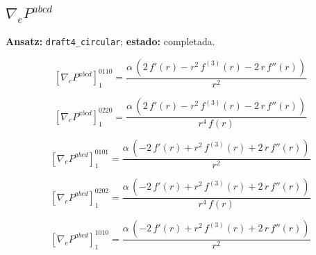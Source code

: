 \documentclass[11pt]{article}
\begin{document}
\subsection*{$ \nabla_e P^{abcd} $}
\textbf{Ansatz:} \texttt{draft4\_circular}; \textbf{estado:} completada.\par
\begin{dmath*}[breakdepth={5}]
\left[\nabla_e P^{abcd}\right]_{1}^{0110} = \frac{\alpha\,\left(2\,f'\!\left(r\right) - {r}^{2}\,f^{(3)}\!\left(r\right) - 2\,r\,f''\!\left(r\right)\right)}{{r}^{2}}
\end{dmath*}
\par\smallskip
\begin{dmath*}[breakdepth={5}]
\left[\nabla_e P^{abcd}\right]_{1}^{0220} = \frac{\alpha\,\left(2\,f'\!\left(r\right) - {r}^{2}\,f^{(3)}\!\left(r\right) - 2\,r\,f''\!\left(r\right)\right)}{{r}^{4}\,f\!\left(r\right)}
\end{dmath*}
\par\smallskip
\begin{dmath*}[breakdepth={5}]
\left[\nabla_e P^{abcd}\right]_{1}^{0101} = \frac{\alpha\,\left(-2\,f'\!\left(r\right) + {r}^{2}\,f^{(3)}\!\left(r\right) + 2\,r\,f''\!\left(r\right)\right)}{{r}^{2}}
\end{dmath*}
\par\smallskip
\begin{dmath*}[breakdepth={5}]
\left[\nabla_e P^{abcd}\right]_{1}^{0202} = \frac{\alpha\,\left(-2\,f'\!\left(r\right) + {r}^{2}\,f^{(3)}\!\left(r\right) + 2\,r\,f''\!\left(r\right)\right)}{{r}^{4}\,f\!\left(r\right)}
\end{dmath*}
\par\smallskip
\begin{dmath*}[breakdepth={5}]
\left[\nabla_e P^{abcd}\right]_{1}^{1010} = \frac{\alpha\,\left(-2\,f'\!\left(r\right) + {r}^{2}\,f^{(3)}\!\left(r\right) + 2\,r\,f''\!\left(r\right)\right)}{{r}^{2}}
\end{dmath*}
\end{document}
